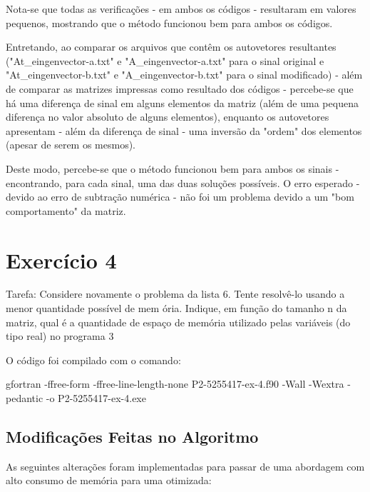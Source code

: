 \documentclass[12pt, a4paper]{article} %
\begin{document}
        Nota-se que todas as verifica\c{c}\~oes - em ambos os c\'odigos - resultaram em valores pequenos, mostrando que o m\'etodo funcionou bem para ambos os c\'odigos.
            
        Entretando, ao comparar os arquivos que cont\^em os autovetores resultantes ("At\_eingenvector-a.txt" e "A\_eingenvector-a.txt" para o sinal original e "At\_eingenvector-b.txt" e "A\_eingenvector-b.txt" para o sinal modificado) - al\'em de comparar as matrizes impressas como resultado dos c\'odigos -  percebe-se que há uma diferen\c{c}a de sinal em alguns elementos da matriz (al\'em de uma pequena diferen\c{c}a no valor absoluto de alguns elementos), enquanto os autovetores apresentam - al\'em da diferen\c{c}a de sinal - uma invers\~ao da "ordem" dos elementos (apesar de serem os mesmos).
        
        Deste modo, percebe-se que o m\'etodo funcionou bem para ambos os sinais - encontrando, para cada sinal, uma das duas solu\c{c}\~oes poss\'iveis. O erro esperado - devido ao erro de subtra\c{c}\~ao num\'erica - n\~ao foi um problema devido a um "bom comportamento" da matriz.

    \section{Exerc\'icio 4}

        Tarefa: Considere novamente o problema da lista 6. Tente resolv\^e-lo usando a menor quantidade poss\'ivel de mem \'oria. Indique, em fun\c{c}\~ao do tamanho n da matriz, qual \'e a quantidade de espa\c{c}o de mem\'oria utilizado pelas vari\'aveis (do tipo real) no programa 3

        O c\'odigo foi compilado com o comando:

    gfortran -ffree-form -ffree-line-length-none P2-5255417-ex-4.f90 -Wall -Wextra -pedantic -o P2-5255417-ex-4.exe

        \subsection*{Modifica\c{c}\~oes Feitas no Algoritmo}

        As seguintes altera\c{c}\~oes foram implementadas para passar de uma abordagem com alto consumo de mem\'oria para uma otimizada:
\end{document}
